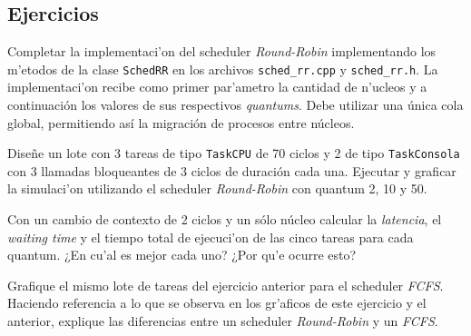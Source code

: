 \documentclass[a4paper,11pt]{article}
\begin{document}
\subsection*{Ejercicios}

\begin{ejercicio}
Completar la implementaci'on del scheduler \emph{Round-Robin} implementando
los m'etodos de la clase \texttt{SchedRR} en los archivos
\texttt{sched\_rr.cpp} y \texttt{sched\_rr.h}. La implementaci'on recibe como primer par'ametro
la cantidad de n'ucleos y a continuación los valores de sus respectivos \emph{quantums}. Debe utilizar una única cola global, permitiendo así la migración de procesos entre núcleos.
\end{ejercicio}

\begin{ejercicio}
Diseñe un lote con 3 tareas de tipo \texttt{TaskCPU} de 70 ciclos y 2 de tipo  \texttt{TaskConsola} con 3 llamadas bloqueantes de 3 ciclos de duración cada una. Ejecutar y graficar la simulaci'on utilizando el scheduler \emph{Round-Robin} con quantum 2, 10 y 50.

Con un cambio de contexto de 2 ciclos y un sólo núcleo calcular la \emph{latencia}, el \emph{waiting time} y el tiempo total de ejecuci'on de las cinco tareas para cada quantum. ¿En cu'al es mejor cada uno? ¿Por qu'e ocurre esto?
\end{ejercicio}


\begin{ejercicio}
Grafique el mismo lote de tareas del ejercicio anterior para el scheduler \emph{FCFS}. Haciendo referencia a lo que se observa en los gr'aficos de este ejercicio y el anterior, explique las diferencias entre un scheduler \emph{Round-Robin} y un \emph{FCFS}.
\end{ejercicio}
\end{document}
